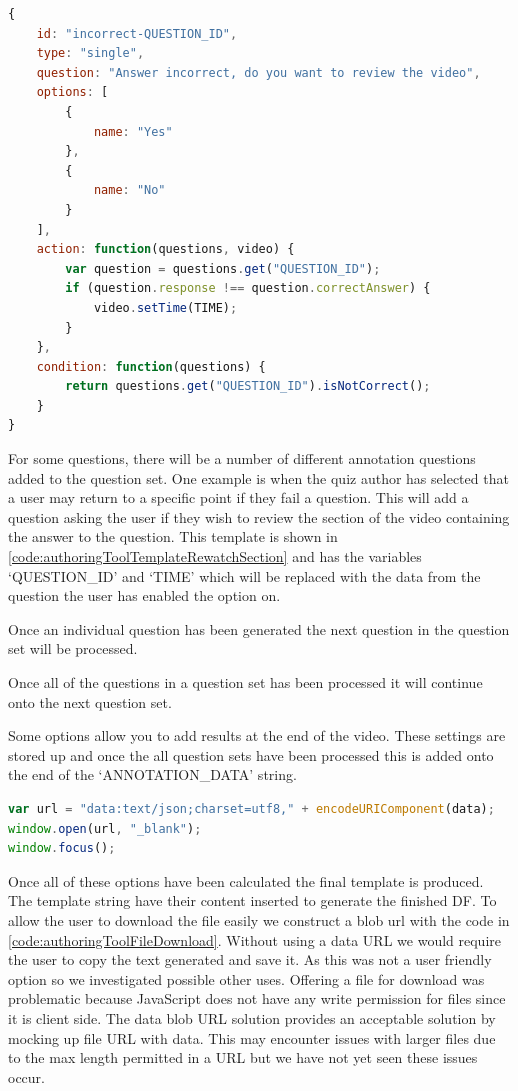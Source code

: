 \begin{lstlisting}[language=javascript,caption={Base template for a question asking if the viewer wishs to review the video section they answered incorrectly},label={code:authoringToolTemplateRewatchSection} ]
{
	id: "incorrect-QUESTION_ID",
	type: "single",
	question: "Answer incorrect, do you want to review the video",
	options: [
		{
			name: "Yes"
		},
		{
			name: "No"
		}
	],
	action: function(questions, video) {
		var question = questions.get("QUESTION_ID");
		if (question.response !== question.correctAnswer) {
			video.setTime(TIME);
		}
	},
	condition: function(questions) {
		return questions.get("QUESTION_ID").isNotCorrect();
	}
}
\end{lstlisting}

For some questions, there will be a number of different annotation questions added to the question set. One example is when the quiz author has selected that a user may return to a specific point if they fail a question. This will add a question asking the user if they wish to review the section of the video containing the answer to the question. This template is shown in \autoref{code:authoringToolTemplateRewatchSection} and has the variables `QUESTION\_ID' and `TIME' which will be replaced with the data from the question the user has enabled the option on.

Once an individual question has been generated the next question in the question set will be processed.

Once all of the questions in a question set has been processed it will continue onto the next question set.

Some options allow you to add results at the end of the video. These settings are stored up and once the all question sets have been processed this is added onto the end of the `ANNOTATION\_DATA' string.

\begin{lstlisting}[language=javascript,caption={The final \gls{DF} is offered for downloading using a data blob URL},label={code:authoringToolFileDownload} ]
var url = "data:text/json;charset=utf8," + encodeURIComponent(data);
window.open(url, "_blank");
window.focus();
\end{lstlisting}

Once all of these options have been calculated the final template is produced. The template string have their content inserted to generate the finished \gls{DF}. To allow the user to download the file easily we construct a blob url with the code in \autoref{code:authoringToolFileDownload}. Without using a data URL we would require the user to copy the text generated and save it. As this was not a user friendly option so we investigated possible other uses. Offering a file for download was problematic because JavaScript does not have any write permission for files since it is client side. The data blob URL solution provides an acceptable solution by mocking up file URL with data. This may encounter issues with larger files due to the max length permitted in a URL but we have not yet seen these issues occur.

